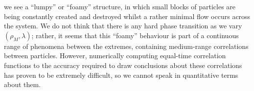 we see a ``lumpy'' or ``foamy'' structure, in which small blocks of particles are being constantly created and destroyed whilst a rather minimal flow occurs across the system.
We do not think that there is any hard phase transition as we vary $(\rho_M , \lambda)$; rather, it seems that this ``foamy'' behaviour is part of a continuous range of phenomena between the extremes, containing medium-range correlations between
particles. However, numerically computing equal-time correlation functions to the accuracy required to draw conclusions about these correlations has proven to be extremely difficult, so we cannot speak in quantitative terms about them.

